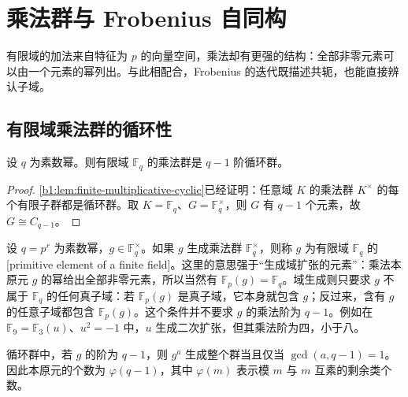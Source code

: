 
\section{乘法群与 Frobenius 自同构}
\label{b1:sec:1702}

%
%

有限域的加法来自特征为 \(p\) 的向量空间，乘法却有更强的结构：全部非零元素可以由一个元素的幂列出。与此相配合，Frobenius 的迭代既描述共轭，也能直接辨认子域。

\subsection{有限域乘法群的循环性}
\label{b1:subsec:1702:01}

\begin{corollary}\label{b1:cor:finite-field-cyclic}
	设 \(q\) 为素数幂。则有限域 \(\mathbb F_q\) 的乘法群是 \(q-1\) 阶循环群。
\end{corollary}
\begin{proof}
	\cref{b1:lem:finite-multiplicative-cyclic}已经证明：任意域 \(K\) 的乘法群 \(K^\times\) 的每个有限子群都是循环群。取 \(K=\mathbb F_q\)、\(G=\mathbb F_q^\times\)，则 \(G\) 有 \(q-1\) 个元素，故 \(G\cong C_{q-1}\)。
\end{proof}
设 \(q=p^r\) 为素数幂，\(g\in\mathbb F_q^\times\)。如果 \(g\) 生成乘法群 \(\mathbb F_q^\times\)，则称 \(g\) 为有限域 \(\mathbb F_q\) 的[primitive element of a finite field]。这里的意思强于“生成域扩张的元素”：乘法本原元 \(g\) 的幂给出全部非零元素，所以当然有 \(\mathbb F_p(g)=\mathbb F_q\)。域生成则只要求 \(g\) 不属于 \(\mathbb F_q\) 的任何真子域：若 \(\mathbb F_p(g)\) 是真子域，它本身就包含 \(g\)；反过来，含有 \(g\) 的任意子域都包含 \(\mathbb F_p(g)\)。这个条件并不要求 \(g\) 的乘法阶为 \(q-1\)。例如在 \(\mathbb F_9=\mathbb F_3(u)\)、\(u^2=-1\) 中，\(u\) 生成二次扩张，但其乘法阶为四，小于八。

\ProseParagraphBreak
循环群中，若 \(g\) 的阶为 \(q-1\)，则 \(g^a\) 生成整个群当且仅当 \(\gcd(a,q-1)=1\)。因此本原元的个数为 \(\varphi(q-1)\)，其中 \(\varphi(m)\) 表示模 \(m\) 与 \(m\) 互素的剩余类个数。

